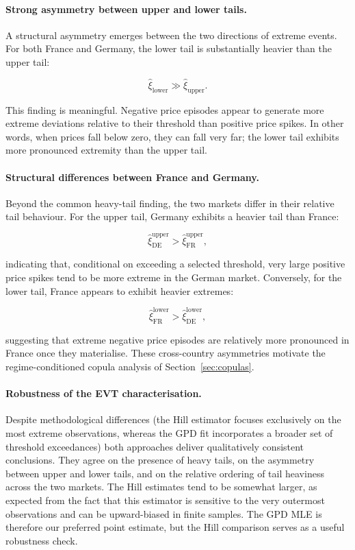 \paragraph{Strong asymmetry between upper and lower tails.}
A structural asymmetry emerges between the two directions of extreme events. For both
France and Germany, the lower tail is substantially heavier than the upper tail:

\[
    \hat\xi_{\mathrm{lower}} \gg \hat\xi_{\mathrm{upper}}.
\]

This finding is meaningful. Negative price episodes appear to generate
more extreme deviations relative to their threshold than positive price spikes. In other
words, when prices fall below zero, they can fall very far; the lower tail exhibits more
pronounced extremity than the upper tail.

\paragraph{Structural differences between France and Germany.}
Beyond the common heavy-tail finding, the two markets differ in their relative tail
behaviour. For the upper tail, Germany exhibits a heavier tail than France:

\[
    \hat\xi_{\mathrm{DE}}^{\mathrm{upper}} > \hat\xi_{\mathrm{FR}}^{\mathrm{upper}},
\]

indicating that, conditional on exceeding a selected threshold, very large positive price spikes 
tend to be more extreme in the German market. Conversely, for the lower tail, France appears to exhibit heavier extremes:

\[
    \hat\xi_{\mathrm{FR}}^{\mathrm{lower}} > \hat\xi_{\mathrm{DE}}^{\mathrm{lower}},
\]

suggesting that extreme negative price episodes are relatively more pronounced in France
once they materialise. These cross-country asymmetries motivate the regime-conditioned
copula analysis of Section~\ref{sec:copulas}.

\paragraph{Robustness of the EVT characterisation.}
Despite methodological differences (the Hill estimator focuses exclusively on the
most extreme observations, whereas the GPD fit incorporates a broader set of
threshold exceedances) both approaches deliver qualitatively consistent conclusions.
They agree on the presence of heavy tails, on the asymmetry between upper and lower
tails, and on the relative ordering of tail heaviness across the two markets. The
Hill estimates tend to be somewhat larger, as expected from the fact that this estimator
is sensitive to the very outermost observations and can be upward-biased in finite
samples. The GPD MLE is therefore our preferred point estimate, but the Hill comparison
serves as a useful robustness check.

